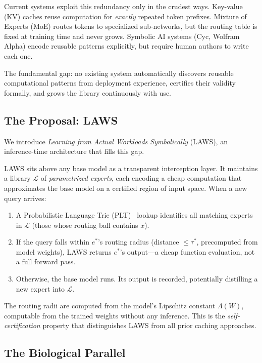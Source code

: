 \documentclass[11pt]{article}
\begin{document}
Current systems exploit this redundancy only in the crudest ways.  Key-value
(KV) caches reuse computation for \emph{exactly} repeated token prefixes.
Mixture of Experts (MoE) routes tokens to specialized sub-networks, but the
routing table is fixed at training time and never grows.  Symbolic AI systems
(Cyc, Wolfram Alpha) encode reusable patterns explicitly, but require
human authors to write each one.

The fundamental gap: no existing system automatically discovers reusable
computational patterns from deployment experience, certifies their validity
formally, and grows the library continuously with use.

\subsection{The Proposal: LAWS}

We introduce \emph{Learning from Actual Workloads Symbolically} (LAWS), an
inference-time architecture that fills this gap.

LAWS sits above any base model as a transparent interception layer.  It
maintains a library $\mathcal{L}$ of \emph{parametrized experts}, each encoding
a cheap computation that approximates the base model on a certified region of
input space.  When a new query arrives:
\begin{enumerate}[leftmargin=2em]
  \item A Probabilistic Language Trie (PLT)~\cite{plt2026} lookup identifies
        all matching experts in $\mathcal{L}$ (those whose routing ball contains $x$).
  \item If the query falls within $e^*$'s routing radius
        (distance $\leq \tau^*$, precomputed from model weights), LAWS returns
        $e^*$'s output---a cheap function evaluation, not a full forward pass.
  \item Otherwise, the base model runs.  Its output is recorded, potentially
        distilling a new expert into $\mathcal{L}$.
\end{enumerate}

The routing radii are computed from the model's Lipschitz constant
$\Lambda(W)$, computable from the trained weights without any inference.  This
is the \emph{self-certification} property that distinguishes LAWS from all prior
caching approaches.

\subsection{The Biological Parallel}
\end{document}
